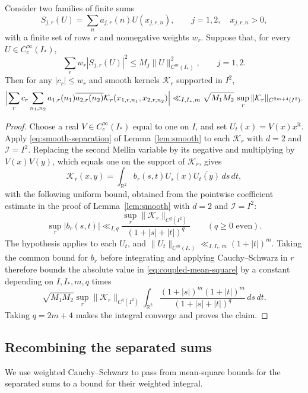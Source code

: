 \begin{lemma}\label{lem:smooth-mean-square}
Consider two families of finite sums
\[
 S_{j,r}(U)=\sum_n a_{j,r}(n)U(x_{j,r,n}),\qquad
 j=1,2,\quad x_{j,r,n}>0,
\]
with a finite set of rows $r$ and nonnegative weights $w_r$.
Suppose that, for every $U\in C_c^\infty(I_*)$,
\[
 \sum_r w_r|S_{j,r}(U)|^2\le M_j\|U\|_{C^m(I_*)}^2,
 \qquad j=1,2.
\]
Then for any $|c_r|\le w_r$ and smooth kernels $\mathcal K_r$
supported in $I^2$,
\begin{equation}\label{eq:coupled-mean-square}
 \Bigl|\sum_r c_r\sum_{n_1,n_2}
 a_{1,r}(n_1)\overline{a_{2,r}(n_2)}
 \mathcal K_r(x_{1,r,n_1},x_{2,r,n_2})\Bigr|
 \ll_{I,I_*,m}\sqrt{M_1M_2}\,
       \sup_r\|\mathcal K_r\|_{C^{2m+4}(I^2)}.
\end{equation}
\end{lemma}
\begin{proof}
Choose a real $V\in C_c^\infty(I_*)$ equal to one on $I$, and set
$U_t(x)=V(x)x^{\mathrm i t}$.
Apply \eqref{eq:smooth-separation} of Lemma~\ref{lem:smooth}
to each $\mathcal K_r$ with $d=2$ and $\mathcal I=I^2$.
Replacing the second Mellin variable by its negative and multiplying
by $V(x)V(y)$, which equals one on the support of $\mathcal K_r$, gives
\[
 \mathcal K_r(x,y)=\int_{\mathbb R^2}b_r(s,t)
 U_s(x)\overline{U_t(y)}\,ds\,dt,
\]
with the following uniform bound, obtained from the pointwise
coefficient estimate in the proof of Lemma~\ref{lem:smooth} with
$d=2$ and $\mathcal I=I^2$:
\[
 \sup_r|b_r(s,t)|\ll_{I,q}
 \frac{\sup_r\|\mathcal K_r\|_{C^q(I^2)}}{(1+|s|+|t|)^q}
 \qquad(q\ge0\text{ even}).
\]
The hypothesis applies to each $U_t$, and
$\|U_t\|_{C^m(I_*)}\ll_{I,I_*,m}(1+|t|)^m$. Taking the common bound for $b_r$ before integrating and applying Cauchy--Schwarz in $r$ therefore bounds the absolute value in \eqref{eq:coupled-mean-square} by a constant depending on $I,I_*,m,q$ times
\begin{equation}\label{eq:kernel-bilinear-integral}
 \sqrt{M_1M_2}\sup_r\|\mathcal K_r\|_{C^q(I^2)}
 \int_{\mathbb R^2}
 \frac{(1+|s|)^m(1+|t|)^m}{(1+|s|+|t|)^q}\,ds\,dt.
\end{equation}
Taking $q=2m+4$ makes the integral converge and proves the claim.
\end{proof}

\subsection{Recombining the separated sums}
We use weighted Cauchy--Schwarz to pass from mean-square bounds
for the separated sums to a bound for their weighted integral.

